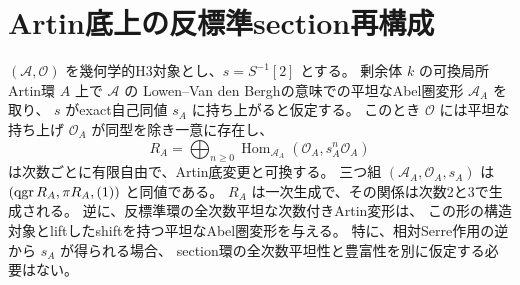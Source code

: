\section{Artin底上の反標準section再構成}
\label{sec:cubic-formal-intrinsic-reconstruction}

\begin{theorem}\label{thm:h3-artin-intrinsic-section-reconstruction}
$(\mathcal A,\mathcal O)$ を幾何学的H3対象とし、$s=S^{-1}[2]$ とする。
剰余体 $k$ の可換局所Artin環 $A$ 上で $\mathcal A$ の
Lowen--Van den Berghの意味での平坦なAbel圏変形 $\mathcal A_A$ を取り、
$s$ がexact自己同値 $s_A$ に持ち上がると仮定する。
このとき $\mathcal O$ には平坦な持ち上げ $\mathcal O_A$ が同型を除き一意に存在し、
\[
 R_A=\bigoplus_{n\ge0}
 \operatorname{Hom}_{\mathcal A_A}(\mathcal O_A,s_A^n\mathcal O_A)
\]
は次数ごとに有限自由で、Artin底変更と可換する。
三つ組 $(\mathcal A_A,\mathcal O_A,s_A)$ は
$(\operatorname{qgr} R_A,\pi R_A,(1))$ と同値である。
$R_A$ は一次生成で、その関係は次数2と3で生成される。
逆に、反標準環の全次数平坦な次数付きArtin変形は、
この形の構造対象とliftしたshiftを持つ平坦なAbel圏変形を与える。
特に、相対Serre作用の逆から $s_A$ が得られる場合、
section環の全次数平坦性と豊富性を別に仮定する必要はない。
\end{theorem}
